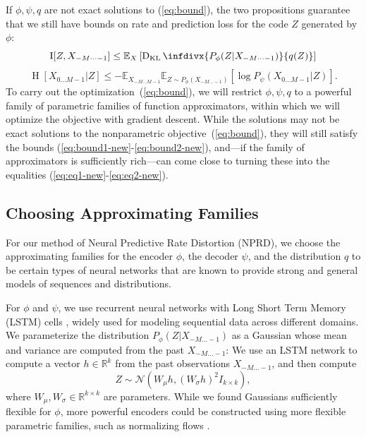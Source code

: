\documentclass[entropy,article,submit,moreauthors,pdftex,10pt,a4paper]{Definitions/mdpi}
\newcommand{\finitefuture}{X_{0\dots M-1}}
\begin{document}
If $\phi, \psi, q$ are not exact solutions to (\ref{eq:bound}), the two propositions guarantee that we still have bounds on rate and prediction loss for the code $Z$ generated by $\phi$:
\begin{equation}\label{eq:bound1-new}
 \operatorname{I}[Z, X_{-M\dots-1}] \leq   \mathbb{E}_{X}\left[ \operatorname{D_{KL}}\infdivx{P_\phi(Z|X_{-M\dots -1})}{q(Z)}\right]
\end{equation}
\begin{equation}\label{eq:bound2-new}
  \operatorname{H}[\finitefuture|Z] \leq   - \mathbb{E}_{X_{-M\dots M-1}}	\mathbb{E}_{Z \sim P_\phi(X_{-M\dots-1})}\left[\log P_\psi(\finitefuture | Z)\right]. %
\end{equation}
To carry out the optimization~(\ref{eq:bound}), we will restrict $\phi, \psi, q$ to a powerful family of parametric families of function approximators, within which we will optimize the objective with gradient descent.
While the solutions may not be exact solutions to the nonparametric objective~(\ref{eq:bound}), they will still satisfy the bounds (\ref{eq:bound1-new}-\ref{eq:bound2-new}), and---if the family of approximators is sufficiently rich---can come close to turning these into the equalities (\ref{eq:eq1-new}-\ref{eq:eq2-new}).
 



\subsection{Choosing Approximating Families}
For our method of Neural Predictive Rate Distortion (NPRD), we choose the approximating families for the encoder $\phi$, the decoder $\psi$, and the distribution $q$ to be certain types of neural networks that are known to provide strong and general models of sequences and distributions.

For $\phi$ and $\psi$, we use recurrent neural networks with Long Short Term Memory (LSTM) cells \citep{hochreiter-long-1997}, widely used for modeling sequential data across different domains.
We parameterize the distribution $P_\phi(Z|X_{-M\dots-1})$ as a Gaussian whose mean and variance are computed from the past $X_{-M\dots-1}$:
We use an LSTM network to compute a vector $h \in \mathbb{R}^k$ from the past observations $X_{-M\dots-1}$, and then compute
\begin{equation}\label{eq:z-gauss}
	Z \sim \mathcal{N}(W_\mu h, (W_\sigma h)^2 I_{k\times k}),
\end{equation}
where $W_\mu, W_\sigma \in \mathbb{R}^{k\times k}$ are parameters.
While we found Gaussians sufficiently flexible for $\phi$, more powerful encoders could be constructed using more flexible parametric families, such as normalizing flows \citep{rezende-variational-2015, kingma-improving-2016}.
\end{document}
